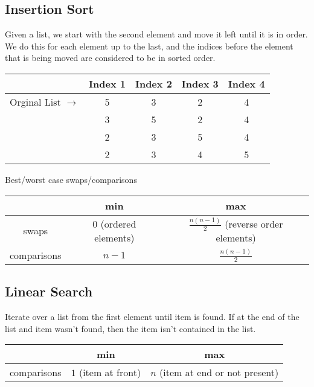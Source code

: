 \documentclass{article}
\begin{document}
\begin{spacing}{1.5}
\subsection{Insertion Sort}
\label{sec:insertionsort}
Given a list, we start with the second element and move it left until it is in order. We do this for each element up to the last, and the indices before the element that is being moved are considered to be in sorted order.\\
\begin{tabular}{c c|c|c|c}
     & Index 1 & Index 2 & Index 3 & Index 4\\
         \hline
    Orginal List $\rightarrow$ & {\color{red}5} & {\color{red}3} & {\color{red}2} & {\color{red}4} \\
     & {\color{green}3} & {\color{green}5} & {\color{red}2} & {\color{red}4}\\
     & {\color{green}2} & {\color{green}3} & {\color{green}5} & {\color{red}4}\\
     & {\color{green}2} & {\color{green}3} & {\color{green}4} & {\color{green}5}\\
\end{tabular}
Best/worst case swaps/comparisons\\
\begin{tabular}{c|c|c}
     & min & max \\
     \hline
    swaps &  $0$ (ordered elements) & $\frac{n(n-1)}{2}$ (reverse order elements)\\
    comparisons & $n-1$ &  $\frac{n(n-1)}{2}$
\end{tabular}
\newpage
\subsection{Linear Search}
\label{sec:linearsearch}
Iterate over a list from the first element until item is found. If at the end of the list and item wasn't found, then the item isn't contained in the list.\\
\begin{tabular}{c|c|c}
     & min & max \\
     \hline
    comparisons & $1$ (item at front) &  $n$ (item at end or not present)
\end{tabular}

\end{spacing}
\end{document}
